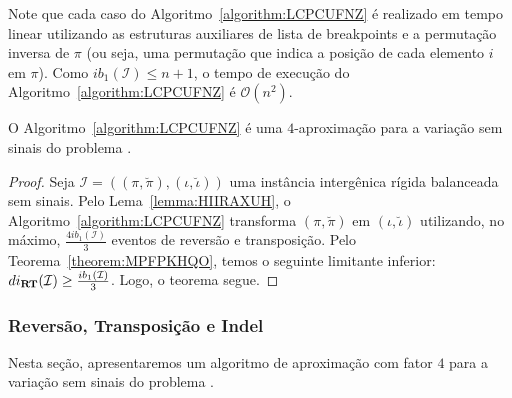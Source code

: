 Note que cada caso do Algoritmo~\ref{algorithm:LCPCUFNZ} é realizado em tempo linear utilizando as estruturas auxiliares de lista de breakpoints e a permutação inversa de $\pi$ (ou seja, uma permutação que indica a posição de cada elemento $i$ em $\pi$). Como $ib_1(\mathcal{I}) \le n + 1$, o tempo de execução do Algoritmo~\ref{algorithm:LCPCUFNZ} é $\mathcal{O}(n^2)$.

\begin{theorem}\label{theorem:USRSHCGH}
O Algoritmo~\ref{algorithm:LCPCUFNZ} é uma $4$-aproximação para a variação sem sinais do problema \SbIRT{}.
\end{theorem}
\begin{proof}
Seja $\mathcal{I} = ((\pi,\breve\pi),(\iota,\breve\iota))$ uma instância intergênica rígida balanceada sem sinais. Pelo Lema~\ref{lemma:HIIRAXUH}, o Algoritmo~\ref{algorithm:LCPCUFNZ} transforma $(\pi,\breve\pi)$ em $(\iota,\breve\iota)$ utilizando, no máximo, $\frac{4ib_1(\mathcal{I})}{3}$ eventos de reversão e transposição. Pelo Teorema~\ref{theorem:MPFPKHQO}, temos o seguinte limitante inferior: $di_{\textbf{RT}}(\mathcal{I}) \ge \frac{ib_1(\mathcal{I})}{3}$. Logo, o teorema segue. 
\end{proof}

\subsubsection{Reversão, Transposição e Indel}

Nesta seção, apresentaremos um algoritmo de aproximação com fator $4$ para a variação sem sinais do problema \SbIRTI{}. 

